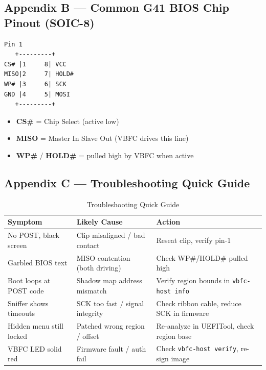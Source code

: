 \subsection*{Appendix B — Common G41 BIOS Chip Pinout (SOIC-8)}

\begin{lstlisting}[style=vbfcStyle]
    Pin 1
   +---------+
CS# |1     8| VCC
MISO|2     7| HOLD#
WP# |3     6| SCK
GND |4     5| MOSI
   +---------+
\end{lstlisting}

\begin{itemize}
    \item \textbf{CS\#} = Chip Select (active low)
    \item \textbf{MISO} = Master In Slave Out (VBFC drives this line)
    \item \textbf{WP\#} / \textbf{HOLD\#} = pulled high by VBFC when active
\end{itemize}

\subsection*{Appendix C — Troubleshooting Quick Guide}

\begin{table}[h]
\centering
\caption{Troubleshooting Quick Guide}
\label{tab:troubleshooting}
\begin{tabular}{@{}lll@{}}
\toprule
\textbf{Symptom} & \textbf{Likely Cause} & \textbf{Action} \\
\midrule
No POST, black screen & Clip misaligned / bad contact & Reseat clip, verify pin-1 \\
Garbled BIOS text & MISO contention (both driving) & Check WP\#/HOLD\# pulled high \\
Boot loops at POST code & Shadow map address mismatch & Verify region bounds in \texttt{vbfc-host info} \\
Sniffer shows timeouts & SCK too fast / signal integrity & Check ribbon cable, reduce SCK in firmware \\
Hidden menu still locked & Patched wrong region / offset & Re-analyze in UEFITool, check region base \\
VBFC LED solid red & Firmware fault / auth fail & Check \texttt{vbfc-host verify}, re-sign image \\
\bottomrule
\end{tabular}
\end{table}

